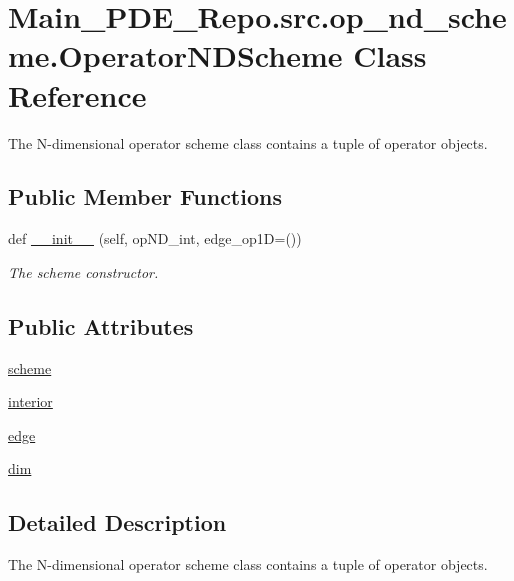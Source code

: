 \hypertarget{classMain__PDE__Repo_1_1src_1_1op__nd__scheme_1_1OperatorNDScheme}{}\section{Main\+\_\+\+P\+D\+E\+\_\+\+Repo.\+src.\+op\+\_\+nd\+\_\+scheme.\+Operator\+N\+D\+Scheme Class Reference}
\label{classMain__PDE__Repo_1_1src_1_1op__nd__scheme_1_1OperatorNDScheme}


The N-\/dimensional operator scheme class contains a tuple of operator objects.  


\subsection*{Public Member Functions}
\begin{DoxyCompactItemize}
\item 
def \hyperlink{classMain__PDE__Repo_1_1src_1_1op__nd__scheme_1_1OperatorNDScheme_ac4dbbc0240cc4c65f01c481376a352f2}{\+\_\+\+\_\+init\+\_\+\+\_\+} (self, op\+N\+D\+\_\+int, edge\+\_\+op1D=())
\begin{DoxyCompactList}\small\item\em The scheme constructor. \end{DoxyCompactList}\end{DoxyCompactItemize}
\subsection*{Public Attributes}
\begin{DoxyCompactItemize}
\item 
\hyperlink{classMain__PDE__Repo_1_1src_1_1op__nd__scheme_1_1OperatorNDScheme_a393609130eb8b43a11601473d09eae44}{scheme}
\item 
\hyperlink{classMain__PDE__Repo_1_1src_1_1op__nd__scheme_1_1OperatorNDScheme_af2d3463cf3af532d774064ebcbe67624}{interior}
\item 
\hyperlink{classMain__PDE__Repo_1_1src_1_1op__nd__scheme_1_1OperatorNDScheme_a620a7d25f82c6a6d2b1b89f8120ff057}{edge}
\item 
\hyperlink{classMain__PDE__Repo_1_1src_1_1op__nd__scheme_1_1OperatorNDScheme_a52e818422354004ce07125bc996d57e7}{dim}
\end{DoxyCompactItemize}


\subsection{Detailed Description}
The N-\/dimensional operator scheme class contains a tuple of operator objects. 

